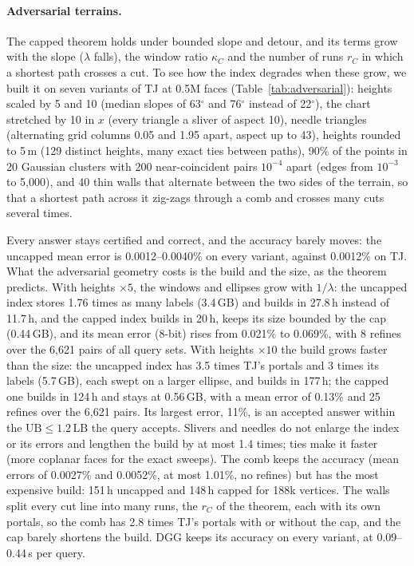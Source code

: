 \documentclass[sigconf,nonacm,screen]{acmart}
\newcommand{\LB}{\mathrm{LB}}
\newcommand{\UB}{\mathrm{UB}}
\begin{document}
\paragraph{Adversarial terrains.}
The capped theorem holds under bounded slope and detour, and its terms grow with the slope ($\lambda$ falls), the
window ratio $\kappa_C$ and the number of runs $r_C$ in which a shortest path crosses a cut. To see how the index
degrades when these grow, we built it on seven variants of TJ at 0.5M faces (Table~\ref{tab:adversarial}):
heights scaled by 5 and 10 (median slopes of 63$^\circ$ and 76$^\circ$ instead of 22$^\circ$), the chart stretched by 10
in $x$ (every triangle a sliver of aspect 10), needle triangles (alternating grid columns 0.05 and 1.95 apart,
aspect up to 43), heights rounded to 5\,m (129 distinct heights, many exact ties between paths), 90\% of the points
in 20 Gaussian clusters with 200 near-coincident pairs $10^{-4}$ apart (edges from $10^{-3}$ to 5,000), and 40 thin
walls that alternate between the two sides of the terrain, so that a shortest path across it zig-zags through a
comb and crosses many cuts several times.

Every answer stays certified and correct, and the accuracy barely moves: the uncapped mean error is
0.0012--0.0040\% on every variant, against 0.0012\% on TJ. What the adversarial geometry costs is the build and
the size, as the theorem predicts. With heights $\times5$, the windows and ellipses grow with $1/\lambda$: the
uncapped index stores 1.76 times as many labels (3.4\,GB) and builds in 27.8\,h instead of 11.7\,h, and the capped
index builds in 20\,h, keeps its size bounded by the cap (0.44\,GB), and its mean error (8-bit) rises from 0.021\% to
0.069\%, with 8 refines over the 6,621 pairs of all query sets. With heights $\times10$ the build grows faster
than the size: the uncapped index has 3.5 times TJ's portals and 3 times its labels (5.7\,GB), each swept on a larger
ellipse, and builds in 177\,h; the capped one builds in 124\,h and stays at 0.56\,GB, with a mean error of 0.13\% and
25 refines over the 6,621 pairs. Its largest error, 11\%, is an accepted answer within the $\UB\le1.2\,\LB$ the query
accepts. Slivers and needles do not enlarge the index or its errors
and lengthen the build by at most 1.4 times; ties make it faster (more coplanar faces for the exact sweeps). The comb keeps the accuracy (mean errors of
0.0027\% and 0.0052\%, at most 1.01\%, no refines) but has the most expensive build: 151\,h uncapped and 148\,h
capped for 188k vertices. The walls split every cut line into many runs, the $r_C$ of the theorem, each with its own
portals, so the comb has 2.8 times TJ's portals with or without the cap, and the cap barely shortens the build.
DGG keeps its accuracy on every variant, at 0.09--0.44\,s per query.
\end{document}
